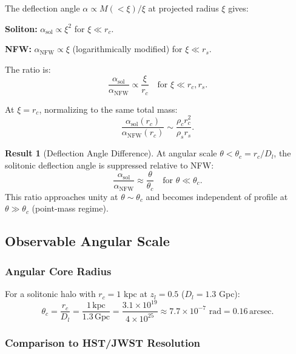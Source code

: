 \documentclass[11pt,a4paper]{article}
\newcommand{\ee}[1]{\times 10^{#1}}
\newcommand{\kpc}{\ensuremath{\mathrm{kpc}}}
\newcommand{\arcsec}{\ensuremath{\mathrm{arcsec}}}
\theoremstyle{definition}
\newtheorem{result}{Result}[section]
\theoremstyle{remark}
\begin{document}
The deflection angle $\alpha \propto M(<\xi)/\xi$ at projected radius $\xi$ gives:

\textbf{Soliton:} $\alpha_{\mathrm{sol}} \propto \xi^2$ for $\xi \ll r_c$.

\textbf{NFW:} $\alpha_{\mathrm{NFW}} \propto \xi$ (logarithmically modified) for $\xi \ll r_s$.

The ratio is:
\begin{equation}
\frac{\alpha_{\mathrm{sol}}}{\alpha_{\mathrm{NFW}}} \propto \frac{\xi}{r_c} \quad \text{for } \xi \ll r_c, r_s.
\end{equation}

At $\xi = r_c$, normalizing to the same total mass:
\begin{equation}
\frac{\alpha_{\mathrm{sol}}(r_c)}{\alpha_{\mathrm{NFW}}(r_c)} \sim \frac{\rho_c r_c^2}{\rho_s r_s}.
\end{equation}

\begin{result}[Deflection Angle Difference]
At angular scale $\theta < \theta_c = r_c/D_l$, the solitonic deflection angle is suppressed relative to NFW:
\begin{equation}
\boxed{\frac{\alpha_{\mathrm{sol}}}{\alpha_{\mathrm{NFW}}} \approx \frac{\theta}{\theta_c} \quad \text{for } \theta \ll \theta_c.}
\end{equation}
This ratio approaches unity at $\theta \sim \theta_c$ and becomes independent of profile at $\theta \gg \theta_c$ (point-mass regime).
\end{result}

\subsection{Observable Angular Scale}
\label{sec:angular_scale}

\subsubsection{Angular Core Radius}

For a solitonic halo with $r_c = 1$ kpc at $z_l = 0.5$ ($D_l = 1.3$ Gpc):
\begin{equation}
\theta_c = \frac{r_c}{D_l} = \frac{1 \, \kpc}{1.3 \, \text{Gpc}} = \frac{3.1 \ee{19}}{4 \ee{25}} \approx 7.7 \ee{-7} \text{ rad} = 0.16 \, \arcsec.
\end{equation}

\subsubsection{Comparison to HST/JWST Resolution}
\end{document}
